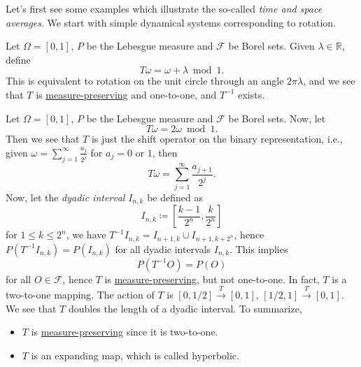 Let's first see some examples which illustrate the so-called \emph{time and space averages}. We start with simple dynamical systems corresponding to rotation.

\begin{eg}[Rotation]
	Let \(\Omega =[0, 1]\), \(P\) be the Lebesgue measure and \(\mathcal{F} \) be Borel sets. Given \(\lambda \in \mathbb{R} \), define
	\[
		T \omega = \omega + \lambda \bmod 1.
	\]
	This is equivalent to rotation on the unit circle through an angle \(2\pi \lambda \), and we see that \(T\) is \hyperref[def:measure-preserving]{measure-preserving} and one-to-one, and \(T^{-1} \) exists.
\end{eg}

\begin{eg}\label{eg:shift-op}
	Let \(\Omega =[0, 1]\), \(P\) be the Lebesgue measure and \(\mathcal{F} \) be Borel sets. Now, let
	\[
		T \omega = 2 \omega \bmod 1.
	\]
	Then we see that \(T\) is just the shift operator on the binary representation, i.e., given \(\omega = \sum_{j=1} ^{\infty} \frac{a_{j} }{2^j}\) for \(a_j = 0\) or \(1\), then
	\[
		T \omega = \sum\limits_{j=1}^{\infty } \frac{a_{j+1}}{2^j}.
	\]
	Now, let the \emph{dyadic interval} \(I_{n, k}\) be defined as
	\[
		I_{n, k}\coloneqq \left[ \frac{k-1}{2^n}, \frac{k}{2^n} \right]
	\]
	for \(1 \leq k \leq 2^n\), we have \(T^{-1} I_{n, k} = I_{n+1, k} \cup I_{n+1, k+ 2^n}\), hence \(P(T^{-1} I_{n, k}) = P(I_{n, k})\) for all dyadic intervals \(I_{n, k}\). This implies
	\[
		P(T^{-1} O) = P(O)
	\]
	for all \(O\in \mathcal{F} \), hence \(T\) is \hyperref[def:measure-preserving]{measure-preserving}, but not one-to-one. In fact, \(T\) is a two-to-one mapping. The action of \(T\) is \([0, 1 / 2] \overset{T}{\to} [0, 1]\), \([1 / 2, 1] \overset{T}{\to} [0, 1]\). We see that \(T\) doubles the length of a dyadic interval. To summarize,
	\begin{itemize}
		\item \(T\) is \hyperref[def:measure-preserving]{measure-preserving} since it is two-to-one.
		\item \(T\) is an expanding map, which is called hyperbolic.
	\end{itemize}
\end{eg}